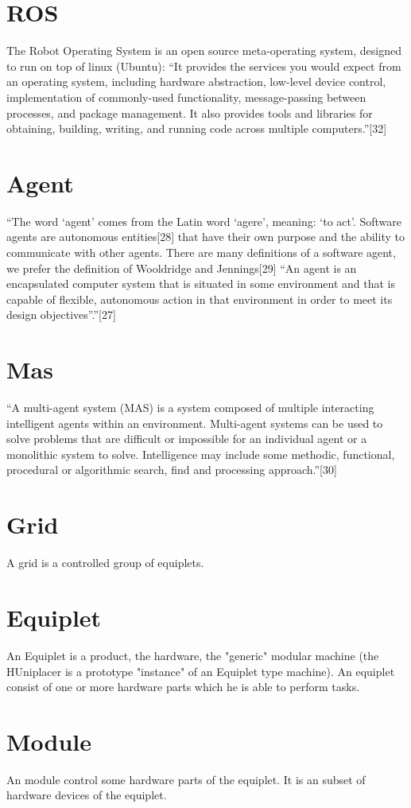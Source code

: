 \documentclass[12pt,a4paper]{report}
\begin{document}
\section{ROS}
The Robot Operating System is an open source meta-operating system, designed to run on top of linux (Ubuntu): “It provides the services you would expect from an operating system, including hardware abstraction, low-level device control, implementation of commonly-used functionality, message-passing between processes, and package management. It also provides tools and libraries for obtaining, building, writing, and running code across multiple computers.”[32]
\section{Agent}
“The word ‘agent’ comes from the Latin word ‘agere’, meaning: ‘to act’. Software agents are autonomous entities[28] that have their own purpose and the ability to communicate with other agents. There are many definitions of a software agent, we prefer the definition of Wooldridge and Jennings[29] “An agent is an encapsulated computer system that is situated in some environment and that is capable of flexible, autonomous action in that environment in
order to meet its design objectives”.”[27]
\section{Mas}
“A multi-agent system (MAS) is a system composed of multiple interacting intelligent agents within an environment. Multi-agent systems can be used to solve problems that are difficult or impossible for an individual agent or a monolithic system to solve. Intelligence may include some methodic, functional, procedural or algorithmic search, find and processing approach.”[30]
\section{Grid}
A grid is a controlled group of equiplets.
\section{Equiplet}
An Equiplet is a product, the hardware, the "generic" modular machine (the HUniplacer is a prototype "instance" of an Equiplet type machine). An equiplet consist of one or more hardware parts which he is able to perform tasks.
\section{Module}
An module control some hardware parts of the equiplet. It is an subset of hardware devices of the equiplet.
\end{document}
